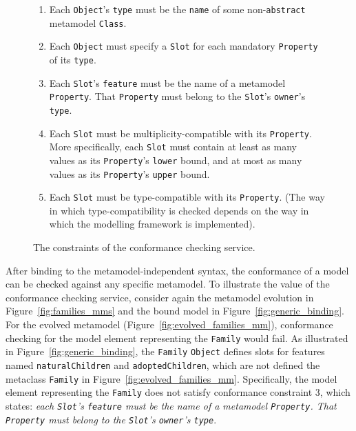 \begin{figure}[p]
	\begin{framed}
	  \begin{enumerate}
			\item Each \texttt{Ob\-je\-ct}'s \texttt{ty\-pe} must be the \texttt{na\-me} of some non-\texttt{ab\-str\-act} metamodel \texttt{Cl\-a\-ss}.
			\item Each \texttt{Ob\-je\-ct} must specify a \texttt{Sl\-ot} for each mandatory \texttt{Pr\-op\-er\-ty} of its \texttt{ty\-pe}.
			\item Each \texttt{Sl\-ot}'s \texttt{fe\-at\-u\-re} must be the name of a metamodel \texttt{Pr\-op\-er\-ty}. That \texttt{Pr\-op\-er\-ty} must belong to the \texttt{Sl\-ot}'s \texttt{ow\-n\-er}'s \texttt{ty\-pe}.
			\item Each \texttt{Sl\-ot} must be multiplicity-compatible with its \texttt{Pr\-op\-er\-ty}. More specifically, each \texttt{Sl\-ot} must contain at least as many values as its \texttt{Pr\-op\-er\-ty}'s \texttt{lo\-w\-er} bound, and at most as many values as its \texttt{Pr\-op\-er\-ty}'s \texttt{up\-p\-er} bound.
		  \item Each \texttt{Sl\-ot} must be type-compatible with its \texttt{Pr\-op\-er\-ty}. (The way in which type-compatibility is checked depends on the way in which the modelling framework is implemented).
		\end{enumerate}
	\end{framed}
  \caption{The constraints of the conformance checking service.}
  \label{fig:conformance_checking_constraints}
\end{figure}

After binding to the metamodel-independent syntax, the conformance of a model can be checked against any specific metamodel. To illustrate the value of the conformance checking service, consider again the metamodel evolution in Figure~\ref{fig:families_mms} and the bound model in Figure~\ref{fig:generic_binding}. For the evolved metamodel (Figure~\ref{fig:evolved_families_mm}), conformance checking for the model element representing the \texttt{Fa\-mi\-ly} would fail. As illustrated in Figure~\ref{fig:generic_binding}, the \texttt{Fa\-mi\-ly} \texttt{Ob\-je\-ct} defines slots for features named  \texttt{na\-tu\-r\-alCh\-il\-dr\-en} and \texttt{ad\-op\-t\-edCh\-il\-dr\-en}, which are not defined the metaclass \texttt{Fa\-mi\-ly} in Figure~\ref{fig:evolved_families_mm}. Specifically, the model element representing the \texttt{Fa\-mi\-ly} does not satisfy conformance constraint 3, which states: \emph{each \texttt{Sl\-ot}'s \texttt{fe\-at\-u\-re} must be the name of a metamodel \texttt{Pr\-op\-er\-ty}. That \texttt{Pr\-op\-er\-ty} must belong to the \texttt{Sl\-ot}'s \texttt{ow\-n\-er}'s \texttt{ty\-pe}}.

